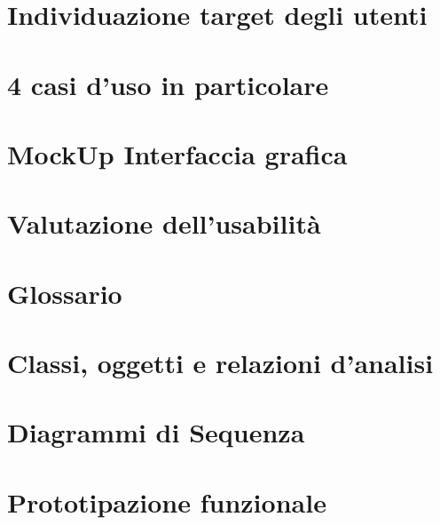 \raggedright{\section{Individuazione target degli utenti}}

\raggedright{\section{4 casi d'uso in particolare}}

\raggedright{\section{MockUp Interfaccia grafica}}

\raggedright{\section{Valutazione dell'usabilità}}

\raggedright{\section{Glossario}}

\raggedright{\section{Classi, oggetti e relazioni d'analisi}}

\raggedright{\section{Diagrammi di Sequenza}}

\raggedright{\section{Prototipazione funzionale}}









